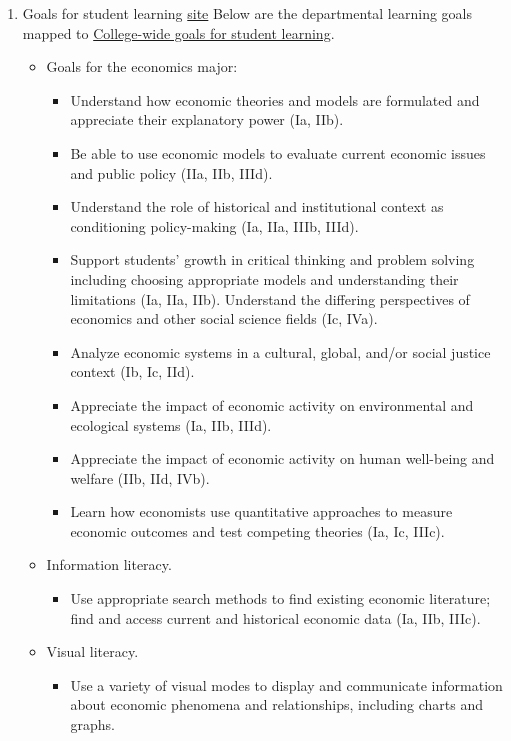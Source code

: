 \documentclass[12pt]{article}
\theoremstyle{plain}
\theoremstyle{plain}
\theoremstyle{plain}
\theoremstyle{plain}
\theoremstyle{plain}
\theoremstyle{plain}
\begin{document}
\begin{enumerate}
\item Goals for student learning \href{https://www.skidmore.edu/economics/student-learning-goals.php}{site}
\label{sec:org59b4b59}
Below are the departmental learning goals mapped to \href{https://www.skidmore.edu/assessment/goals-for-student-learning.php}{College-wide goals for student learning}.
\begin{itemize}
\item Goals for the economics major:
\begin{itemize}
\item Understand how economic theories and models are formulated and appreciate their explanatory power (Ia, IIb).
\item Be able to use economic models to evaluate current economic issues and public policy (IIa, IIb, IIId).
\item Understand the role of historical and institutional context as conditioning policy-making (Ia, IIa, IIIb, IIId).
\item Support students' growth in critical thinking and problem solving including choosing appropriate models and understanding their limitations (Ia, IIa, IIb).
Understand the differing perspectives of economics and other social science fields (Ic, IVa).
\item Analyze economic systems in a cultural, global, and/or social justice context (Ib, Ic, IId).
\item Appreciate the impact of economic activity on environmental and ecological systems (Ia, IIb, IIId).
\item Appreciate the impact of economic activity on human well-being and welfare (IIb, IId, IVb).
\item Learn how economists use quantitative approaches to measure economic outcomes and test competing theories (Ia, Ic, IIIc).
\end{itemize}
\item Information literacy.
\begin{itemize}
\item Use appropriate search methods to find existing economic literature; find and access current and historical economic data (Ia, IIb, IIIc).
\end{itemize}
\item Visual literacy.
\begin{itemize}
\item Use a variety of visual modes to display and communicate information about economic phenomena and relationships, including charts and graphs.

\end{itemize}
\end{itemize}
\end{enumerate}
\end{document}
